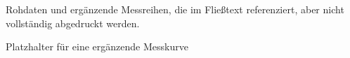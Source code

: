 Rohdaten und ergänzende Messreihen, die im Fließtext referenziert, aber nicht vollständig abgedruckt werden.

\begin{Figure}[title=Messreihe A, height=3cm, anchor=center, justify=center, text-size=12pt]
  Platzhalter für eine ergänzende Messkurve
\end{Figure}
